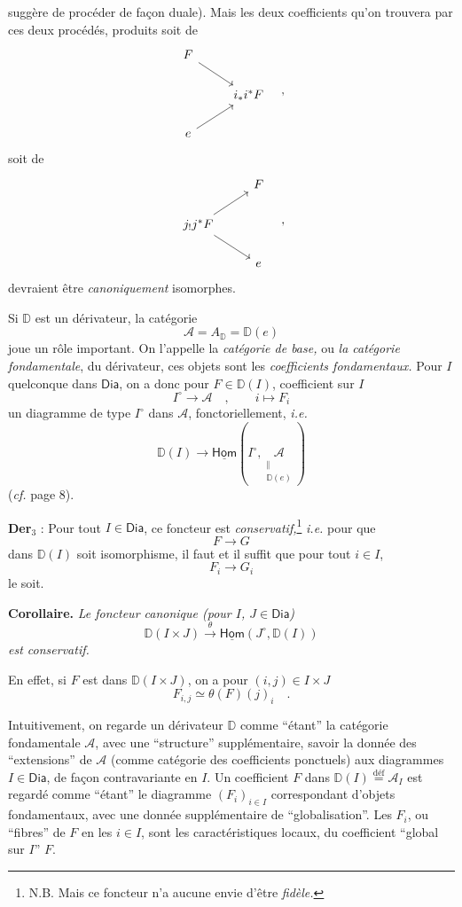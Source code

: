 \documentclass[11pt]{article}
\newcommand{\printedpage}[1]{\marginpar{\footnotesize p.~#1}}
\newcommand{\msp}[1]{\marginpar{\footnotesize [#1]}}
\newcommand{\DD}{\mathbb{D}}
\newcommand{\uHom}{\underline{\mathsf{Hom}}}
\newcommand{\Dia}{\mathsf{Dia}}
\newcommand{\defeq}{\overset{\text{déf}}{=}}
\begin{document}
\printedpage{9}
\noindent suggère de procéder de façon duale). Mais les deux coefficients qu’on trouvera par ces deux procédés, produits soit de
\[
\begin{tikzcd}
F \arrow[dr] & \\
 & i_*i^*F \\
e \arrow[ur] &
\end{tikzcd}
\quad ,
\]
soit de
\[
\begin{tikzcd}
 & F \\
j_!j^*F \arrow[ur] \arrow[dr] & \\
 & e
\end{tikzcd}
\quad ,
\]
devraient être \textit{canoniquement} isomorphes.

\noindent\msp{page 11}Si $\DD$ est un dérivateur, la catégorie
\[
\mathcal{A} = A_{\DD} = \DD(e) %
\]
joue un rôle important. On l’appelle la \textit{catégorie de base,} ou \textit{la catégorie fondamentale}, du dérivateur, ces objets sont les \textit{coefficients fondamentaux.} Pour $I$ quelconque dans $\Dia$, on a donc pour $F \in \DD(I)$, coefficient sur $I$ %
\[
I^\circ \longrightarrow \mathcal{A} \quad , \qquad i \longmapsto F_i
\]
un diagramme de type $I^\circ$ dans $\mathcal{A}$, fonctoriellement, \textit{i.e.}
\[
\DD(I)\longrightarrow
\uHom(I^\circ,\underset{\substack{\Vert\\\DD(e)}}{\mathcal A})
\]
(\textit{cf.} page 8).

\noindent\textbf{Der}$_3$ : Pour tout $I \in \Dia$, ce foncteur est \textit{conservatif,}\footnote[4]{N.B. Mais ce foncteur n’a aucune envie d’être \textit{fidèle.}} \textit{i.e.} pour que
\[
F \longrightarrow G
\]
\printedpage{10}%
dans $\DD(I)$ soit isomorphisme, il faut et il suffit que pour tout $i \in I$,
\[
F_i \longrightarrow G_i
\]
le soit.

\noindent\textbf{Corollaire.} \textit{Le foncteur canonique (pour $I$, $J \in \Dia$)}
\[
\DD(I \times J) \xrightarrow{\ \theta\ } \uHom(J^\circ, \DD(I))
\]
\textit{est conservatif.}

En effet, si $F$ est dans $\DD(I \times J)$, on a pour $(i,j) \in I \times J$
\[
F_{i,j} \simeq \theta(F)(j)_i \quad .
\]

\noindent\msp{page 12}Intuitivement, on regarde un dérivateur $\DD$ comme “étant” la catégorie fondamentale $\mathcal{A}$, avec une “structure” supplémentaire, savoir la donnée des “extensions” de $\mathcal{A}$ (comme catégorie des coefficients ponctuels) aux diagrammes $I \in \Dia$, de façon contravariante en $I$. Un coefficient $F$ dans $\DD(I) \defeq \mathcal{A}_I$ est regardé comme “étant” le diagramme $(F_i)_{i\in I}$ correspondant d’objets fondamentaux, avec une donnée supplémentaire de “globalisation”. Les $F_i$, ou “fibres” de $F$ en les $i \in I$, sont les caractéristiques locaux, du coefficient “global sur $I$” $F$. %
\end{document}
